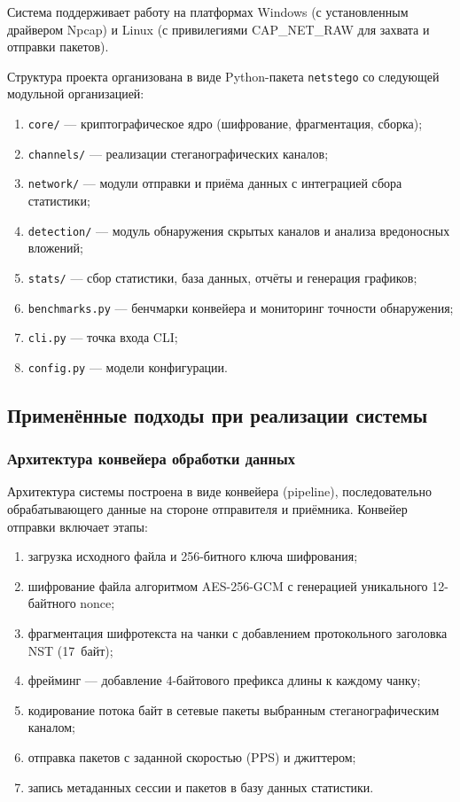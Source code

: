 Система поддерживает работу на платформах Windows (с установленным драйвером Npcap) и Linux (с привилегиями CAP\_NET\_RAW для захвата и отправки пакетов).

Структура проекта организована в виде Python-пакета \texttt{netstego} со следующей модульной организацией:

\begin{enumerate}[label=\arabic*)]
    \item \texttt{core/} --- криптографическое ядро (шифрование, фрагментация, сборка);
    \item \texttt{channels/} --- реализации стеганографических каналов;
    \item \texttt{network/} --- модули отправки и приёма данных с интеграцией сбора статистики;
    \item \texttt{detection/} --- модуль обнаружения скрытых каналов и анализа вредоносных вложений;
    \item \texttt{stats/} --- сбор статистики, база данных, отчёты и генерация графиков;
    \item \texttt{benchmarks.py} --- бенчмарки конвейера и мониторинг точности обнаружения;
    \item \texttt{cli.py} --- точка входа CLI;
    \item \texttt{config.py} --- модели конфигурации.
\end{enumerate}

\subsection{Применённые подходы при реализации системы}

\subsubsection{Архитектура конвейера обработки данных}

Архитектура системы построена в виде конвейера (pipeline), последовательно обрабатывающего данные на стороне отправителя и приёмника. Конвейер отправки включает этапы:

\begin{enumerate}[label=\arabic*)]
    \item загрузка исходного файла и 256-битного ключа шифрования;
    \item шифрование файла алгоритмом AES-256-GCM с генерацией уникального 12-байтного nonce;
    \item фрагментация шифротекста на чанки с добавлением протокольного заголовка NST (17~байт);
    \item фрейминг --- добавление 4-байтового префикса длины к каждому чанку;
    \item кодирование потока байт в сетевые пакеты выбранным стеганографическим каналом;
    \item отправка пакетов с заданной скоростью (PPS) и джиттером;
    \item запись метаданных сессии и пакетов в базу данных статистики.
\end{enumerate}

